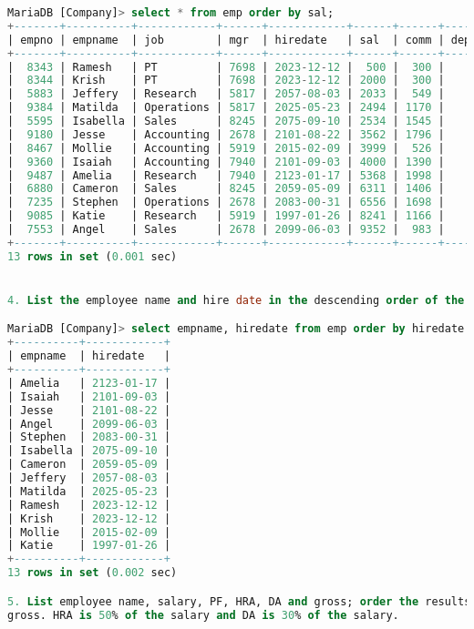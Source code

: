 \documentclass[11pt]{article}
\begin{document}
\begin{lstlisting}[language=SQL]
MariaDB [Company]> select * from emp order by sal;
+-------+----------+------------+------+------------+------+------+--------+
| empno | empname  | job        | mgr  | hiredate   | sal  | comm | deptno |
+-------+----------+------------+------+------------+------+------+--------+
|  8343 | Ramesh   | PT         | 7698 | 2023-12-12 |  500 |  300 |     60 |
|  8344 | Krish    | PT         | 7698 | 2023-12-12 | 2000 |  300 |     60 |
|  5883 | Jeffery  | Research   | 5817 | 2057-08-03 | 2033 |  549 |     20 |
|  9384 | Matilda  | Operations | 5817 | 2025-05-23 | 2494 | 1170 |     40 |
|  5595 | Isabella | Sales      | 8245 | 2075-09-10 | 2534 | 1545 |     30 |
|  9180 | Jesse    | Accounting | 2678 | 2101-08-22 | 3562 | 1796 |     10 |
|  8467 | Mollie   | Accounting | 5919 | 2015-02-09 | 3999 |  526 |     10 |
|  9360 | Isaiah   | Accounting | 7940 | 2101-09-03 | 4000 | 1390 |     10 |
|  9487 | Amelia   | Research   | 7940 | 2123-01-17 | 5368 | 1998 |     20 |
|  6880 | Cameron  | Sales      | 8245 | 2059-05-09 | 6311 | 1406 |     30 |
|  7235 | Stephen  | Operations | 2678 | 2083-00-31 | 6556 | 1698 |     40 |
|  9085 | Katie    | Research   | 5919 | 1997-01-26 | 8241 | 1166 |     20 |
|  7553 | Angel    | Sales      | 2678 | 2099-06-03 | 9352 |  983 |     30 |
+-------+----------+------------+------+------------+------+------+--------+
13 rows in set (0.001 sec)


4. List the employee name and hire date in the descending order of the hire date.

MariaDB [Company]> select empname, hiredate from emp order by hiredate desc;
+----------+------------+
| empname  | hiredate   |
+----------+------------+
| Amelia   | 2123-01-17 |
| Isaiah   | 2101-09-03 |
| Jesse    | 2101-08-22 |
| Angel    | 2099-06-03 |
| Stephen  | 2083-00-31 |
| Isabella | 2075-09-10 |
| Cameron  | 2059-05-09 |
| Jeffery  | 2057-08-03 |
| Matilda  | 2025-05-23 |
| Ramesh   | 2023-12-12 |
| Krish    | 2023-12-12 |
| Mollie   | 2015-02-09 |
| Katie    | 1997-01-26 |
+----------+------------+
13 rows in set (0.002 sec)

5. List employee name, salary, PF, HRA, DA and gross; order the results in the ascending order of
gross. HRA is 50% of the salary and DA is 30% of the salary.


\end{lstlisting}
\end{document}
